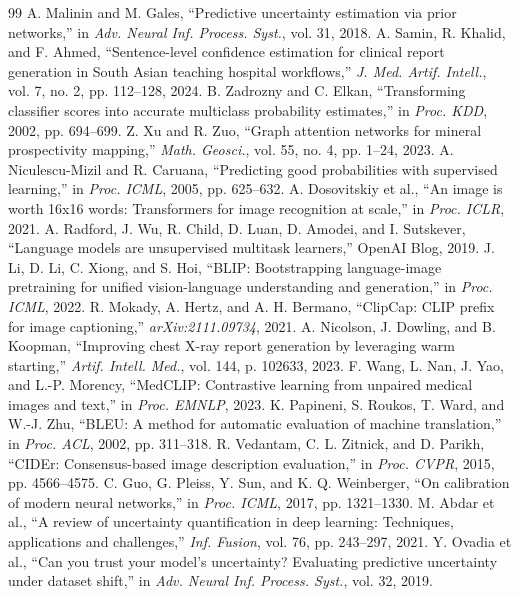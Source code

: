 \documentclass{jcst}
\begin{document}
\begin{thebibliography}{99}
 A. Malinin and M. Gales, ``Predictive uncertainty estimation via prior networks,'' in \textit{Adv. Neural Inf. Process. Syst.}, vol. 31, 2018.
 A. Samin, R. Khalid, and F. Ahmed, ``Sentence-level confidence estimation for clinical report generation in South Asian teaching hospital workflows,'' \textit{J. Med. Artif. Intell.}, vol. 7, no. 2, pp. 112–128, 2024.
 B. Zadrozny and C. Elkan, ``Transforming classifier scores into accurate multiclass probability estimates,'' in \textit{Proc. KDD}, 2002, pp. 694–699.
 Z. Xu and R. Zuo, ``Graph attention networks for mineral prospectivity mapping,'' \textit{Math. Geosci.}, vol. 55, no. 4, pp. 1–24, 2023.
 A. Niculescu-Mizil and R. Caruana, ``Predicting good probabilities with supervised learning,'' in \textit{Proc. ICML}, 2005, pp. 625–632.
 A. Dosovitskiy et al., ``An image is worth 16x16 words: Transformers for image recognition at scale,'' in \textit{Proc. ICLR}, 2021.
 A. Radford, J. Wu, R. Child, D. Luan, D. Amodei, and I. Sutskever, ``Language models are unsupervised multitask learners,'' OpenAI Blog, 2019.
 J. Li, D. Li, C. Xiong, and S. Hoi, ``BLIP: Bootstrapping language-image pretraining for unified vision-language understanding and generation,'' in \textit{Proc. ICML}, 2022.
 R. Mokady, A. Hertz, and A. H. Bermano, ``ClipCap: CLIP prefix for image captioning,'' \textit{arXiv:2111.09734}, 2021.
 A. Nicolson, J. Dowling, and B. Koopman, ``Improving chest X-ray report generation by leveraging warm starting,'' \textit{Artif. Intell. Med.}, vol. 144, p. 102633, 2023.
 F. Wang, L. Nan, J. Yao, and L.-P. Morency, ``MedCLIP: Contrastive learning from unpaired medical images and text,'' in \textit{Proc. EMNLP}, 2023.
 K. Papineni, S. Roukos, T. Ward, and W.-J. Zhu, ``BLEU: A method for automatic evaluation of machine translation,'' in \textit{Proc. ACL}, 2002, pp. 311–318.
 R. Vedantam, C. L. Zitnick, and D. Parikh, ``CIDEr: Consensus-based image description evaluation,'' in \textit{Proc. CVPR}, 2015, pp. 4566–4575.
 C. Guo, G. Pleiss, Y. Sun, and K. Q. Weinberger, ``On calibration of modern neural networks,'' in \textit{Proc. ICML}, 2017, pp. 1321–1330.
 M. Abdar et al., ``A review of uncertainty quantification in deep learning: Techniques, applications and challenges,'' \textit{Inf. Fusion}, vol. 76, pp. 243–297, 2021.
 Y. Ovadia et al., ``Can you trust your model's uncertainty? Evaluating predictive uncertainty under dataset shift,'' in \textit{Adv. Neural Inf. Process. Syst.}, vol. 32, 2019.

\end{thebibliography}
\end{document}
